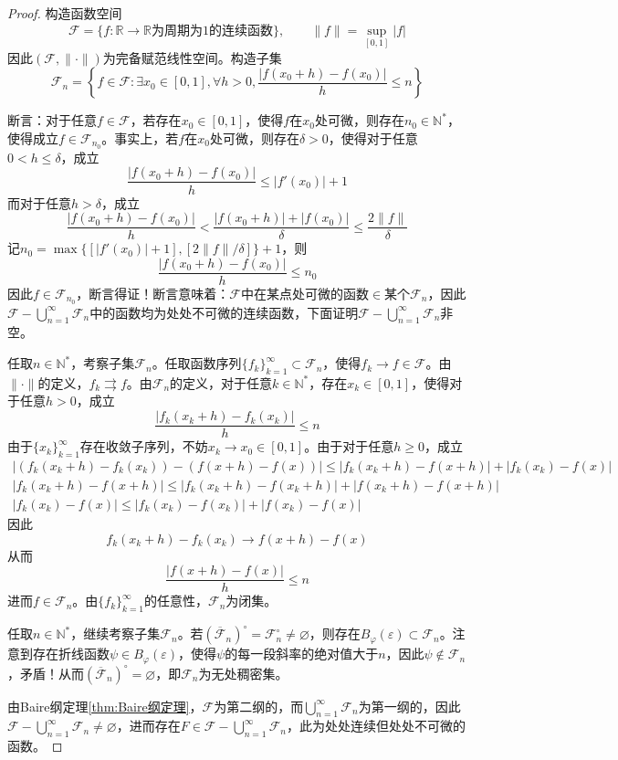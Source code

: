 \documentclass[lang = cn, scheme = chinese, thmcnt = section]{elegantbook}
\newcommand{\N}{\mathbb{N}}            %
\newcommand{\R}{\mathbb{R}}            %
\newcommand{\sub}{\subset}             %
\newcommand{\dis}{\displaystyle}
\begin{document}
\begin{proof}
	构造函数空间
	$$
	\mathscr{F}=\{ f:\R\to\R\text{为周期为}1\text{的连续函数} \},\qquad 
	\|f\|=\sup_{[0,1]}|f|
	$$
	因此$(\mathscr{F},\|\cdot\|)$为完备赋范线性空间。构造子集
	$$
	\mathscr{F}_n=\left\{ f\in \mathscr{F}:\exists x_0\in[0,1],\forall h>0,\frac{|f(x_0+h)-f(x_0)|}{h}\le n \right\}
	$$
	
	断言：对于任意$f\in \mathscr{F}$，若存在$x_0\in [0,1]$，使得$f$在$x_0$处可微，则存在$n_0\in\N^*$，使得成立$f\in\mathscr{F}_{n_0}$。事实上，若$f$在$x_0$处可微，则存在$\delta>0$，使得对于任意$0<h\le \delta$，成立%
	$$
	\frac{|f(x_0+h)-f(x_0)|}{h}\le |f'(x_0)|+1
	$$
	而对于任意$h>\delta$，成立
	$$
	\frac{|f(x_0+h)-f(x_0)|}{h}
	<\frac{|f(x_0+h)|+|f(x_0)|}{\delta}
	\le\frac{2\|f\|}{\delta}
	$$
	记$n_0=\max\{ [|f'(x_0)|+1],[2\|f\|/\delta] \}+1$，则
	$$
	\frac{|f(x_0+h)-f(x_0)|}{h}\le n_0
	$$
	因此$f\in \mathscr{F}_{n_0}$，断言得证！断言意味着：$\mathscr{F}$中在某点处可微的函数$\in$某个$\mathscr{F}_n$，因此$\dis\mathscr{F}-\bigcup_{n=1}^{\infty}\mathscr{F}_n$中的函数均为处处不可微的连续函数，下面证明$\dis\mathscr{F}-\bigcup_{n=1}^{\infty}\mathscr{F}_n$非空。
	
	任取$n\in\N^*$，考察子集$\mathscr{F}_n$。任取函数序列$\{f_k\}_{k=1}^{\infty}\sub \mathscr{F}_n$，使得$f_k\to f\in\mathscr{F}$。由$\|\cdot\|$的定义，$f_k\rightrightarrows f$。由$\mathscr{F}_n$的定义，对于任意$k\in\N^*$，存在$x_k\in[0,1]$，使得对于任意$h>0$，成立
	$$
	\frac{|f_k(x_k+h)-f_k(x_k)|}{h}\le n
	$$
	由于$\{ x_k \}_{k=1}^{\infty}$存在收敛子序列，不妨$x_k\to x_0\in [0,1]$。由于对于任意$h\ge 0$，成立
	\begin{gather*}
		|(f_k(x_k+h)-f_k(x_k))-(f(x+h)-f(x))|\le |f_k(x_k+h)-f(x+h)|+|f_k(x_k)-f(x)|\\
		|f_k(x_k+h)-f(x+h)|\le |f_k(x_k+h)-f(x_k+h)|+|f(x_k+h)-f(x+h)|\\
		|f_k(x_k)-f(x)|\le |f_k(x_k)-f(x_k)|+|f(x_k)-f(x)|
	\end{gather*}
	因此
	$$
	f_k(x_k+h)-f_k(x_k)\to f(x+h)-f(x)
	$$
	从而
	$$
	\frac{|f(x+h)-f(x)|}{h}\le n
	$$
	进而$f\in \mathscr{F}_n$。由$\{f_k\}_{k=1}^{\infty}$的任意性，$\mathscr{F}_n$为闭集。
	
	任取$n\in\N^*$，继续考察子集$\mathscr{F}_n$。若$(\overline{\mathscr{F}}_n)^\circ=\mathscr{F}_n^\circ\ne\varnothing$，则存在$B_{\varphi}(\varepsilon)\sub \mathscr{F}_n$。注意到存在折线函数$\psi\in B_{\varphi}(\varepsilon)$，使得$\psi$的每一段斜率的绝对值大于$n$，因此$\psi\notin \mathscr{F}_n$，矛盾！从而$(\overline{\mathscr{F}}_n)^\circ=\varnothing$，即$\mathscr{F}_n$为无处稠密集。
	
	由Baire纲定理\ref{thm:Baire纲定理}，$\mathscr{F}$为第二纲的，而$\dis\bigcup_{n=1}^{\infty}\mathscr{F}_n$为第一纲的，因此$\dis\mathscr{F}-\bigcup_{n=1}^{\infty}\mathscr{F}_n\ne\varnothing$，进而存在$\displaystyle F\in \mathscr{F}-\bigcup_{n=1}^{\infty}\mathscr{F}_n$，此为处处连续但处处不可微的函数。
\end{proof}
\end{document}
